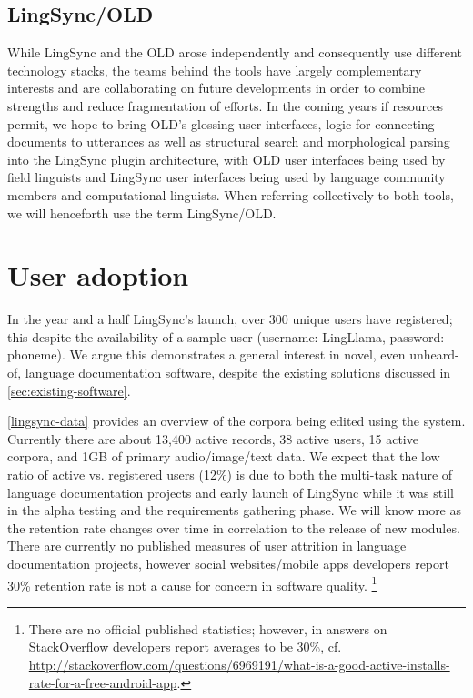 \documentclass[11pt]{article}
\begin{document}
\subsection{LingSync/OLD}

While LingSync and the OLD arose independently and consequently use different
technology stacks, the teams behind the tools have largely complementary
interests and are collaborating on future developments in order to combine
strengths and reduce fragmentation of efforts. In the coming years if resources
permit, we hope to bring OLD's glossing user interfaces, logic for connecting
documents to utterances as well as structural search and morphological parsing
into the LingSync plugin architecture, with OLD user interfaces being used by
field linguists and LingSync user interfaces being used by language community
members and computational linguists. When referring collectively to both tools,
we will henceforth use the term LingSync/OLD.


\section{User adoption}

In the year and a half LingSync's launch, over 300 unique users have
registered; this despite the availability of a sample user (username:
LingLlama, password: phoneme). We argue this demonstrates a general interest in
novel, even unheard-of, language documentation software, despite the existing
solutions discussed in \autoref{sec:existing-software}.

\autoref{lingsync-data} provides an overview of the corpora being edited using
the system. Currently there are about 13,400 active records, 38 active users,
15 active corpora, and 1GB of primary audio/image/text data. We expect that the
low ratio of active vs. registered users (12\%) is due to both the multi-task
nature of language documentation projects and early launch of LingSync while it
was still in the alpha testing and the requirements gathering phase. We will
know more as the retention rate changes over time  in correlation to the
release of new modules. There are currently no published measures of user
attrition in language documentation projects, however social websites/mobile
apps  developers report 30\% retention rate is not a cause for concern in
software quality.%
\footnote{There are no official published statistics; however, in answers on
    StackOverflow developers report averages to be 30\%, cf.
\url{http://stackoverflow.com/questions/6969191/what-is-a-good-active-installs-rate-for-a-free-android-app}.}
\end{document}
